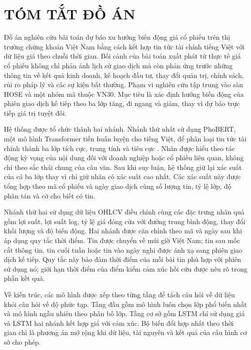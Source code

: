 \chapter*{TÓM TẮT ĐỒ ÁN}

Đồ án nghiên cứu bài toán dự báo xu hướng biến động giá cổ phiếu trên thị trường chứng
khoán Việt Nam bằng cách kết hợp tin tức tài chính tiếng Việt với dữ liệu giá theo chuỗi
thời gian. Bối cảnh của bài toán xuất phát từ thực tế giá cổ phiếu không chỉ phản ánh
lịch sử giao dịch mà còn phản ứng trước những thông tin về kết quả kinh doanh, kế hoạch
đầu tư, thay đổi quản trị, chính sách, rủi ro pháp lý và các sự kiện bất thường. Phạm
vi nghiên cứu tập trung vào sàn HOSE và một nhóm mã thuộc VN30. Mục tiêu là xác định
hướng biến động của phiên giao dịch kế tiếp theo ba lớp tăng, đi ngang và giảm, thay vì
dự báo trực tiếp giá trị tuyệt đối.

Hệ thống được tổ chức thành hai nhánh. Nhánh thứ nhất sử dụng PhoBERT, một mô hình
Transformer tiền huấn luyện cho tiếng Việt, để phân loại tin tức tài chính thành ba
lớp tích cực, trung tính và tiêu cực \cite{Nguyen2020_200300744v3}. Nhãn được hiểu theo
tác động kỳ vọng của nội dung đối với doanh nghiệp hoặc cổ phiếu liên quan, không chỉ
theo sắc thái chung của câu văn. Sau khi suy luận, hệ thống giữ lại xác suất của cả ba
lớp thay vì chỉ giữ nhãn có xác suất cao nhất. Các xác suất này được tổng hợp theo mã
cổ phiếu và ngày giao dịch cùng số lượng tin, tỷ lệ lớp, độ phân tán và cờ cho biết có
tin.

Nhánh thứ hai sử dụng dữ liệu OHLCV điều chỉnh cùng các đặc trưng nhân quả gồm lợi suất,
lợi suất log, tỷ lệ giá đóng cửa với đường trung bình động, thay đổi khối lượng và độ
biến động. Hai nhánh được căn chỉnh theo mã và ngày sau khi áp dụng quy tắc thời điểm.
Tin được chuyển về múi giờ Việt Nam; tin sau mốc cắt thông tin, tin cuối tuần hoặc tin
vào ngày nghỉ được ánh xạ sang phiên giao dịch kế tiếp. Quy tắc này bảo đảm thời điểm của
mỗi bài tin phù hợp với phiên sử dụng nó; giới hạn thời điểm của điểm kiểm cảm xúc hồi cứu
được nêu rõ trong phần kết quả.

Về kiến trúc, các mô hình được xếp theo từng tầng để tách câu hỏi về dữ liệu khỏi câu
hỏi về độ phức tạp. Tầng đầu gồm mô hình luôn chọn lớp phổ biến nhất và mô hình ngẫu
nhiên theo phân bố lớp. Tầng cơ sở gồm LSTM chỉ sử dụng giá và LSTM hai nhánh kết hợp
giá với cảm xúc. Bộ biến đổi hợp nhất theo thời gian chỉ là phương án mở rộng khi dữ
liệu, tài nguyên và kết quả của cấu hình cơ sở cho phép.


